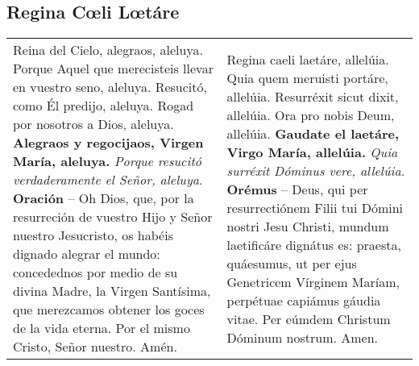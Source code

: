 \documentclass[./devocionario.tex]{subfiles}
\begin{document}
\subsection*{Regina Cœli Lœtáre}
\begin{tabular} { p{} p{} }

    Reina del Cielo, alegraos, aleluya.\newline
    Porque Aquel que merecisteis llevar en vuestro seno, aleluya.\newline
    Resucitó, como Él predijo, aleluya.\newline
    Rogad por nosotros a Dios, aleluya.\newline
    \textbf{Alegraos y regocijaos, Virgen María, aleluya.}\newline
    \textit{Porque resucitó verdaderamente el Señor, aleluya}.\newline
    \textbf{Oración} -- Oh Dios, que, por la resurreción de vuestro Hijo y Señor nuestro Jesucristo, 
    os habéis dignado alegrar el mundo: concedednos por medio de su divina Madre, la Virgen Santísima, 
    que merezcamos obtener los goces de la vida eterna. Por el mismo Cristo, Señor nuestro. Amén.

    &

    Regina caeli laetáre, allelúia.\newline
    Quia quem meruisti portáre, allelúia.\newline
    Resurréxit sicut dixit, allelúia.\newline
    Ora pro nobis Deum, allelúia.\newline
    \textbf{Gaudate el laetáre, Virgo María, allelúia.}\newline
    \textit{Quia surréxit Dóminus vere, allelúia.}\newline
    \textbf{Orémus} -- Deus, qui per resurrectiónem Filii tui Dómini nostri Jesu Christi, 
    mundum laetificáre dignátus es: praesta, quáesumus, ut per ejus Genetricem Vírginem Maríam, 
    perpétuae capiámus gáudia vitae. Per eúmdem Christum Dóminum nostrum. Amen.
\end{tabular}
\end{document}
